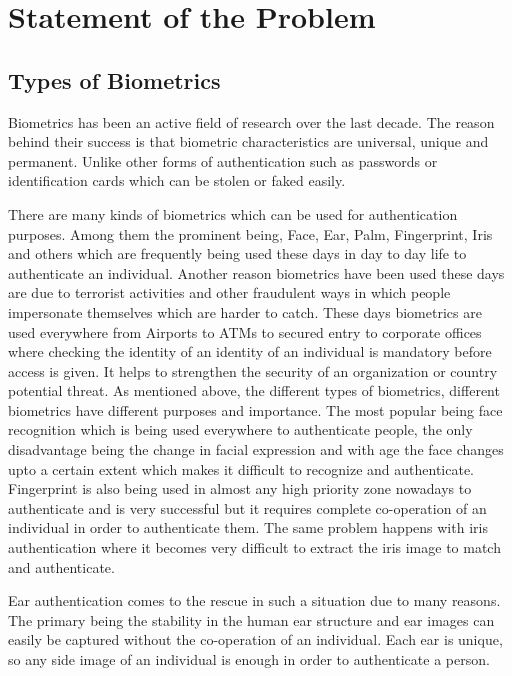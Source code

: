 \chapter{Statement of the Problem}
\label{sec:problem}

\section{Types of Biometrics} Biometrics has been an active field of research over the last decade. The reason behind their success is that biometric characteristics are universal, unique and permanent. Unlike other forms of authentication such as passwords or identification cards which can be stolen or faked easily.

There are many kinds of biometrics which can be used for authentication purposes. Among them the prominent being, Face, Ear, Palm, Fingerprint\cite{fingerprint}, Iris and others which are frequently being used these days in day to day life to authenticate an individual. Another reason biometrics have been used these days are due to terrorist activities and other fraudulent ways in which people impersonate themselves which are harder to catch. These days biometrics are used everywhere from Airports to ATMs to secured entry to corporate offices where checking the identity of an identity of an individual is mandatory before access is given. It helps to strengthen the security of an organization or country potential threat. As mentioned above, the different types of biometrics, different biometrics have different purposes and importance. The most popular being face recognition which is being used everywhere to authenticate people, the only disadvantage being the change in facial expression and with age the face changes upto a certain extent which makes it difficult to recognize and authenticate. Fingerprint is also being used in almost any high priority zone nowadays to authenticate and is very successful but it requires complete co-operation of an individual in order to authenticate them. The same problem happens with iris authentication where it becomes very difficult to extract the iris image to match and authenticate. 

Ear authentication comes to the rescue in such a situation due to many reasons. The primary being the stability in the human ear structure and ear images can easily be captured without the co-operation of an individual. Each ear is unique, so any side image of an individual is enough in order to authenticate a person.

